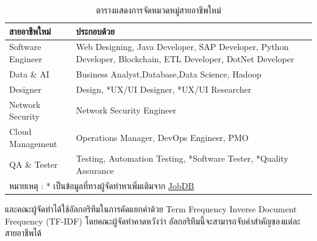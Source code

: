 \begin{table}[H]
    \caption{ตารางแสดงการจัดหมวดหมู่สายอาชีพใหม่}
    \label{tab:grouping_data}
    \begin{tabularx}{\textwidth}{|l|X|} \hline
        สายอาชีพใหม่        & ประกอบด้วย                                                                                                   \\ \hline
        Software Engineer & Web Designing, Java Developer, SAP Developer, Python Developer, Blockchain, ETL Developer, DotNet Developer \\\hline
        Data \& AI        & Business Analyst,Database,Data Science, Hadoop                                                              \\\hline
        Designer          & Design, *UX/UI Designer, *UX/UI Researcher                                                                  \\\hline
        Network Security  & Network Security Engineer                                                                                   \\\hline
        Cloud Management  & Operations Manager, DevOps Engineer, PMO                                                                    \\\hline
        QA \& Tester      & Testing, Automation Testing, *Software Tester, *Quality Assurance                                           \\\hline
        \multicolumn{2}{l}{หมายเหตุ : * เป็นข้อมูลที่ทางผู้จัดทำหาเพิ่มเติมจาก \href{https://th.jobsdb.com/}{JobDB}}                                 \\ \hline\hline
    \end{tabularx}
\end{table}

และคณะผู้จัดทำได้ใช้อัลกอริทึมในการคัดแยกคำด้วย Term Frequency Inverse Document Frequency (TF-IDF) โดยคณะผู้จัดทำคาดหวังว่า
อัลกอริทึมนี้จะสามารถจับคำสำคัญของแต่ละสายอาชีพได้

